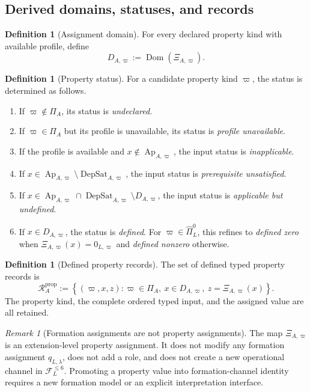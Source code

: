 \documentclass[11pt]{article}
\newcommand{\FVI}{\mathcal F_{L}^{\le 6}}
\newcommand{\PiZero}{\widehat{\Pi}_{L}^{0}}
\newcommand{\Ap}{\operatorname{Ap}}
\newcommand{\DepSat}{\operatorname{DepSat}}
\newcommand{\Dom}{\operatorname{Dom}}
\newcommand{\PropRec}{\mathcal R^{\mathrm{prop}}}
\theoremstyle{definition}
\newtheorem{definition}[theorem]{Definition}
\theoremstyle{remark}
\newtheorem{remark}[theorem]{Remark}
\begin{document}
\subsection{Derived domains, statuses, and records}

\begin{definition}[Assignment domain]
For every declared property kind with available profile, define
\[
D_{A,\varpi}:=\Dom(\Xi_{A,\varpi}).
\]
\end{definition}

\begin{definition}[Property status]
\label{def:status}
For a candidate property kind \(\varpi\), the status is determined as follows.
\begin{enumerate}[label=(\arabic*)]
\item If \(\varpi\notin\Pi_A\), its status is \emph{undeclared}.
\item If \(\varpi\in\Pi_A\) but its profile is unavailable, its status is \emph{profile unavailable}.
\item If the profile is available and \(x\notin\Ap_{A,\varpi}\), the input status is \emph{inapplicable}.
\item If \(x\in\Ap_{A,\varpi}\setminus\DepSat_{A,\varpi}\), the input status is \emph{prerequisite unsatisfied}.
\item If \(x\in\Ap_{A,\varpi}\cap\DepSat_{A,\varpi}\setminus D_{A,\varpi}\), the input status is \emph{applicable but undefined}.
\item If \(x\in D_{A,\varpi}\), the status is \emph{defined}. For \(\varpi\in\PiZero\), this refines to \emph{defined zero} when \(\Xi_{A,\varpi}(x)=0_{L,\varpi}\) and \emph{defined nonzero} otherwise.
\end{enumerate}
\end{definition}

\begin{definition}[Defined property records]
The set of defined typed property records is
\[
\PropRec_A:=
\left\{
(\varpi,x,z):
\varpi\in\Pi_A,
\ x\in D_{A,\varpi},
\ z=\Xi_{A,\varpi}(x)
\right\}.
\]
The property kind, the complete ordered typed input, and the assigned value are all retained.
\end{definition}

\begin{remark}[Formation assignments are not property assignments]
The map \(\Xi_{A,\varpi}\) is an extension-level property assignment.
It does not modify any formation assignment \(q_{L,\lambda}\), does not add a role, and does not create a new operational channel in \(\FVI\).
Promoting a property value into formation-channel identity requires a new formation model or an explicit interpretation interface.
\end{remark}
\end{document}
